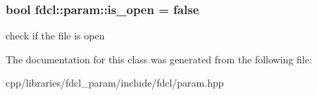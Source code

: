 \subsubsection[{\texorpdfstring{is\+\_\+open}{is_open}}]{\setlength{\rightskip}{0pt plus 5cm}bool fdcl\+::param\+::is\+\_\+open = false}\hypertarget{classfdcl_1_1param_a1b19aff80fe92fc5e5b8b994744830eb}{}\label{classfdcl_1_1param_a1b19aff80fe92fc5e5b8b994744830eb}
check if the file is open 

The documentation for this class was generated from the following file\+:\begin{DoxyCompactItemize}
\item 
cpp/libraries/fdcl\+\_\+param/include/fdcl/param.\+hpp\end{DoxyCompactItemize}
